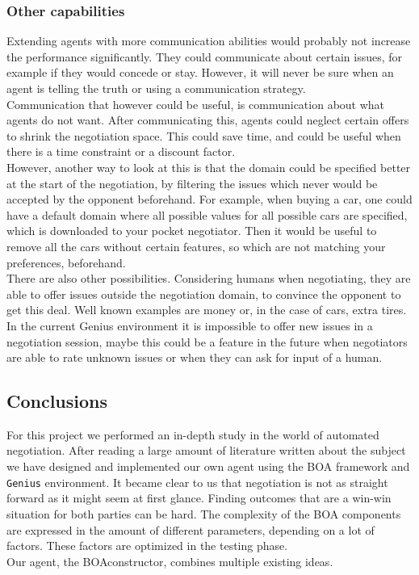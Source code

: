 \subsubsection{Other capabilities}
Extending agents with more communication abilities would probably not increase the performance significantly. They could
communicate about certain issues, for example if they would concede or stay. However, it will never be sure when an agent is telling the truth or using a communication strategy. \\

Communication that however could be useful, is communication about what agents do not want. After communicating this, agents could neglect certain offers to shrink the negotiation space. This could save time, and could be useful when there is a time constraint or a discount factor. \\

However, another way to look at this is that the domain could be specified better at the start of the negotiation, by filtering the issues which never would be accepted by the opponent beforehand. For example, when buying a car, one could have a default domain where all possible values for all possible cars are specified, which is 
downloaded to your pocket negotiator. Then it would be useful to remove all the cars without certain features, so which are not matching your preferences, beforehand. \\

There are also other possibilities. Considering humans when negotiating, they are able to offer issues outside the negotiation domain, to convince the opponent to get this deal. Well known examples are money or, in the case of cars, extra tires. In the current Genius environment it is impossible to offer new issues in a negotiation session, maybe this could be a feature in the future when negotiators are able to rate unknown issues or when they can ask for input of a human. 

\subsection{Conclusions}

For this project we performed an in-depth study in the world of automated negotiation. After reading a large amount of literature written about the subject we have designed and implemented our own agent using the BOA framework and \texttt{Genius} environment. It became clear to us that negotiation is not as straight forward as it might seem at first glance. Finding outcomes that are a win-win situation for both parties can be hard. The complexity of the BOA components are expressed in the amount of different parameters, depending on a lot of factors. These factors are optimized in the testing phase.  \\

Our agent, the BOAconstructor, combines multiple existing ideas.


